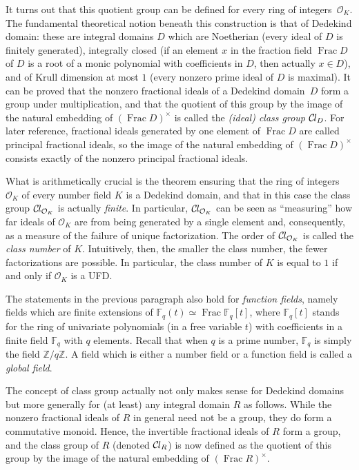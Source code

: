 \documentclass[sn-mathphys]{sn-jnl}%
\newcommand*{\OK}[1][K]{\mathcal{O}_{#1}}
\newcommand*{\Cl}{\mathcal{C}\kern-.075em l}
\newcommand*{\Fq}[1][q]{\mathbb{F}_{#1}}
\renewcommand{\Z}{\mathbb{Z}}
\DeclareMathOperator{\Frac}{Frac}
\begin{document}
It turns out that this quotient group can be defined for every ring of integers~$\OK$.
The fundamental theoretical notion beneath this construction is that of Dedekind domain: these are integral domains $D$ which are Noetherian (every ideal of $D$ is finitely generated), integrally closed (if an element $x$ in the fraction field $\Frac D$ of $D$ is a root of a monic polynomial with coefficients in $D$, then actually $x \in D$), and of Krull dimension at most $1$ (every nonzero prime ideal of $D$ is maximal).
It can be proved that the nonzero fractional ideals of a Dedekind domain~$D$
form a group under multiplication, and that the quotient of this group by the image of the natural embedding of $(\Frac D)^\times$ is called the \emph{\textup{(}ideal\textup{)} class group} $\Cl_{D}$.
For later reference, fractional ideals generated by one element of $\Frac D$ are called principal fractional ideals, so the image of the natural embedding of $(\Frac D)^\times$ consists exactly of the nonzero principal fractional ideals.

What is arithmetically crucial is the theorem ensuring that the ring of integers $\OK$ of every number field $K$ is a Dedekind domain,
and that in this case the class group $\Cl_{\OK}$ is actually \emph{finite}.
In particular, $\Cl_{\OK}$ can be seen as ``measuring'' how far ideals of $\OK$ are from being generated by a single element and,
consequently, as a measure of the failure of unique factorization.
The order of $\Cl_{\OK}$ is called the \emph{class number} of $K$.
Intuitively, then, the smaller the class number, the fewer factorizations are possible.
In particular, the class number of $K$ is equal to $1$ if and only if $\OK$ is a UFD.

The statements in the previous paragraph also hold for \emph{function fields}, namely fields which are finite extensions of $\Fq(t) \simeq \Frac \Fq[q][t]$, where $\Fq[q][t]$ stands for the ring of univariate polynomials (in a free variable $t$) with coefficients in a finite field $\Fq$ with $q$ elements. Recall that when $q$ is a prime number, $\Fq$ is simply the field $\Z/q\Z$.
A field which is either a number field or a function field is called a \emph{global field}.

The concept of class group actually not only makes sense for Dedekind domains but more generally for (at least) any integral domain $R$ as follows. While the nonzero fractional ideals of $R$ in general need not be a group, they do form a commutative monoid. Hence, the invertible fractional ideals of $R$ form a group, and the class group of $R$ (denoted $\Cl_{R}$) is now defined as the quotient of this group by the image of the natural embedding of $(\Frac R)^\times$.
\end{document}
